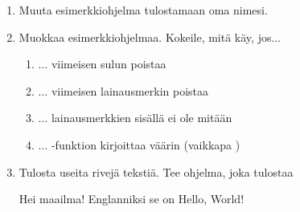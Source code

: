 \begin{enumerate}[\thesection .1]
\item Muuta esimerkkiohjelma tulostamaan oma nimesi.
\item Muokkaa esimerkkiohjelmaa. Kokeile, mitä käy, jos...
	\begin{enumerate}
	\item ... viimeisen sulun poistaa
	\item ... viimeisen lainausmerkin poistaa
	\item ... lainausmerkkien sisällä ei ole mitään
	\item ... -funktion kirjoittaa väärin (vaikkapa )
	\end{enumerate}
\item Tulosta useita rivejä tekstiä. Tee ohjelma, joka tulostaa

\begin{output}
Hei maailma!
Englanniksi se on Hello, World!
\end{output}

\end{enumerate}
